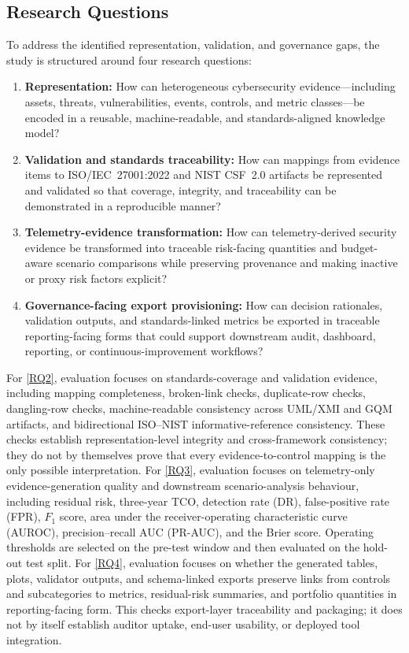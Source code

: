 \documentclass[preprint,12pt]{elsarticle}
\begin{document}
\subsection{Research Questions}
\label{sec:research-questions}

To address the identified representation, validation, and governance gaps, the study is structured around four research questions:

\begin{enumerate}[label=\textbf{RQ\arabic*},ref=RQ\arabic*,labelsep=0.4em,leftmargin=2.6em]
  \item \label{RQ1} \textbf{Representation:} How can heterogeneous cybersecurity evidence---including assets, threats, vulnerabilities, events, controls, and metric classes---be encoded in a reusable, machine-readable, and standards-aligned knowledge model?
  \item \label{RQ2} \textbf{Validation and standards traceability:} How can mappings from evidence items to ISO/IEC~27001:2022 and NIST CSF~2.0 artifacts be represented and validated so that coverage, integrity, and traceability can be demonstrated in a reproducible manner?
  \item \label{RQ3} \textbf{Telemetry-evidence transformation:} How can telemetry-derived security evidence be transformed into traceable risk-facing quantities and budget-aware scenario comparisons while preserving provenance and making inactive or proxy risk factors explicit?
  \item \label{RQ4} \textbf{Governance-facing export provisioning:} How can decision rationales, validation outputs, and standards-linked metrics be exported in traceable reporting-facing forms that could support downstream audit, dashboard, reporting, or continuous-improvement workflows?
\end{enumerate}

For \ref{RQ2}, evaluation focuses on standards-coverage and validation evidence, including mapping completeness, broken-link checks, duplicate-row checks, dangling-row checks, machine-readable consistency across UML/XMI and GQM artifacts, and bidirectional ISO--NIST informative-reference consistency. These checks establish representation-level integrity and cross-framework consistency; they do not by themselves prove that every evidence-to-control mapping is the only possible interpretation. For \ref{RQ3}, evaluation focuses on telemetry-only evidence-generation quality and downstream scenario-analysis behaviour, including residual risk, three-year TCO, detection rate (DR), false-positive rate (FPR), $F_{1}$ score, area under the receiver-operating characteristic curve (AUROC), precision--recall AUC (PR-AUC), and the Brier score. Operating thresholds are selected on the pre-test window and then evaluated on the hold-out test split. For \ref{RQ4}, evaluation focuses on whether the generated tables, plots, validator outputs, and schema-linked exports preserve links from controls and subcategories to metrics, residual-risk summaries, and portfolio quantities in reporting-facing form. This checks export-layer traceability and packaging; it does not by itself establish auditor uptake, end-user usability, or deployed tool integration.
\end{document}
